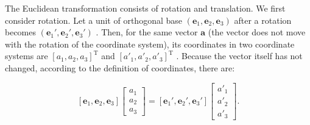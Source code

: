 The Euclidean transformation consists of rotation and translation. We first consider rotation. Let a unit of orthogonal base $ ( \bm {e}_ 1 , \bm {e}_ 2 , \bm {e}_ 3 ) $ after a rotation becomes $ ( \bm {e}_ 1 ' , \bm {e}_ 2 ', \bm {e}_ 3 ') $ . Then, for the same vector $ \bm {a} $ (the vector does not move with the rotation of the coordinate system), its coordinates in two coordinate systems are $ [a_ 1 , a_ 2 , a_ 3 ] ^ \mathrm {T} $ and $[a'_ 1 , a'_ 2 , a'_ 3 ]^ \mathrm {T} $ . Because the vector itself has not changed, according to the definition of coordinates, there are:

\begin{equation}
\left[ \bm{e}_1,\bm{e}_2,\bm{e}_3 \right]\left[ \begin{array}{l}
{a_1}\\
{a_2}\\
{a_3}
\end{array} \right] = \left[ \bm{e}_1', \bm{e}_2', \bm{e}_3' \right]\left[ \begin{array}{l}
a'_1\\
a'_2\\
a'_3
\end{array} \right].
\end{equation}


